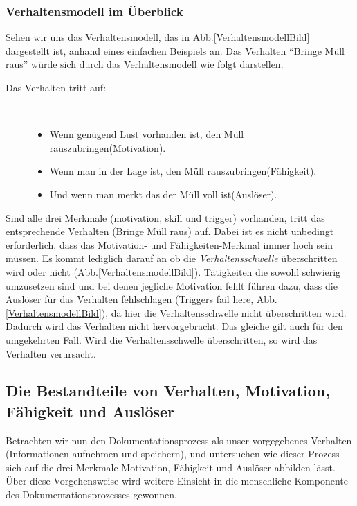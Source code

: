 \documentclass[a4paper,12pt]{scrartcl}
\begin{document}
\subsubsection{Verhaltensmodell im Überblick}
Sehen wir uns das Verhaltensmodell, das in Abb.\ref{VerhaltensmodellBild} dargestellt ist, anhand eines einfachen Beispiels an. Das Verhalten \enquote{Bringe Müll raus} würde sich durch das Verhaltensmodell wie folgt darstellen. 
\begin{description}
   \item[Das Verhalten tritt auf:]~\par
   \begin{itemize}
      \item Wenn genügend Lust vorhanden ist, den Müll rauszubringen(Motivation).
      \item Wenn man in der Lage ist, den Müll rauszubringen(Fähigkeit).
      \item Und wenn man merkt das der Müll voll ist(Auslöser).
   \end{itemize}
\end{description}  
Sind alle drei Merkmale (motivation, skill und trigger) vorhanden, tritt das entsprechende Verhalten (Bringe Müll raus) auf. Dabei ist es nicht unbedingt erforderlich, dass das Motivation- und Fähigkeiten-Merkmal immer hoch sein müssen. Es kommt lediglich darauf an ob die \textit{Verhaltensschwelle} überschritten wird oder nicht (Abb.\ref{VerhaltensmodellBild}). Tätigkeiten die sowohl schwierig umzusetzen sind und bei denen jegliche Motivation fehlt führen dazu, dass die Auslöser für das Verhalten fehlschlagen (Triggers fail here, Abb.\ref{VerhaltensmodellBild}), da hier die Verhaltensschwelle nicht überschritten wird. Dadurch wird das Verhalten nicht hervorgebracht. Das gleiche gilt auch für den umgekehrten Fall. Wird die Verhaltensschwelle überschritten, so wird das Verhalten verursacht. 

\subsection{Die Bestandteile von Verhalten, Motivation, Fähigkeit und Auslöser}
Betrachten wir nun den Dokumentationsprozess als unser vorgegebenes Verhalten (Informationen aufnehmen und speichern), und untersuchen wie dieser Prozess sich auf die drei Merkmale Motivation, Fähigkeit und Auslöser abbilden lässt. Über diese Vorgehensweise wird weitere Einsicht in die menschliche Komponente des Dokumentationsprozesses gewonnen.
\end{document}
